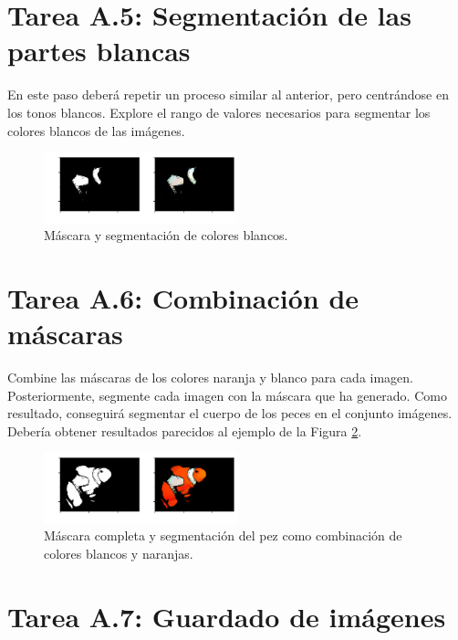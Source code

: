 \section*{Tarea A.5: Segmentación de las partes blancas}

En este paso deberá repetir un proceso similar al anterior, pero centrándose en los tonos blancos. Explore el rango de valores necesarios para segmentar los colores blancos de las imágenes.

\begin{figure}[h]
    \centering
    \includegraphics[width=0.5\textwidth]{Lab_2/template/figures/white.png}
    \caption{Máscara y segmentación de colores blancos.}
    \label{fig:whithe_mask}
\end{figure}

\section*{Tarea A.6: Combinación de máscaras}

Combine las máscaras de los colores naranja y blanco para cada imagen. Posteriormente, segmente cada imagen con la máscara que ha generado. Como resultado, conseguirá segmentar el cuerpo de los peces en el conjunto imágenes. Debería obtener resultados parecidos al ejemplo de la Figura \ref{fig:fish_output}.


\begin{figure}[h]
    \centering
    \includegraphics[width=0.5\textwidth]{Lab_2/template/figures/output.png}
    \caption{Máscara completa y segmentación del pez como combinación de colores blancos y naranjas.}
    \label{fig:fish_output}
\end{figure}


\section*{Tarea A.7: Guardado de imágenes}


